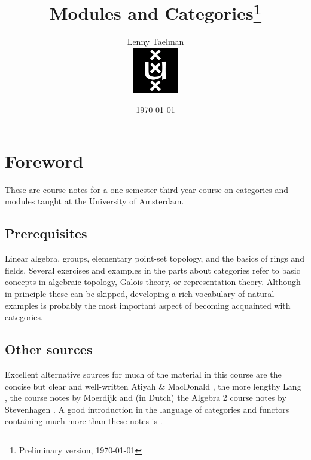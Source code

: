 \documentclass[11pt]{amsbook}
\theoremstyle{plain}
\theoremstyle{definition}
\begin{document}
\title
 {Modules and Categories\footnote{Preliminary version, \today}}


\author
 {Lenny Taelman \\\medskip\bigskip\bigskip\medskip\bigskip\bigskip\medskip\bigskip\bigskip\medskip\bigskip\bigskip\medskip\bigskip\bigskip\medskip\bigskip\bigskip\medskip\bigskip\bigskip\medskip\bigskip\bigskip\medskip\bigskip\bigskip\medskip\bigskip\bigskip\medskip\bigskip\bigskip
 \includegraphics[height=2cm]{uva}}
 
 \date
 {\today}



\maketitle


\tableofcontents


\chapter*{Foreword}

These are course notes for a one-semester third-year course on categories and modules taught at the University of Amsterdam. 

\section*{Prerequisites}

Linear algebra, groups, elementary point-set topology, and the basics of rings and fields. Several exercises and  examples in the parts about categories refer to basic concepts in algebraic topology, Galois theory, or representation theory. Although in principle these can be skipped, developing a rich vocabulary of natural  examples is probably the most important aspect of becoming acquainted with categories.


\section*{Other sources}

Excellent alternative sources for much of the material in this course are the concise but clear and well-written Atiyah \& MacDonald \cite{AtiyahMacDonald}, the more lengthy Lang \cite{Lang}, the course notes by Moerdijk \cite{Moerdijk} and (in Dutch) the Algebra 2 course notes by Stevenhagen \cite{Stevenhagen}. A good introduction in the language of categories and functors containing much more than these notes is \cite{Leinster}.
\end{document}

